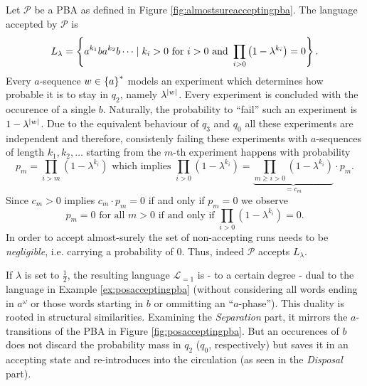 \begin{example}
 \cite{DecProblemsForProbAuto}
  Let $\mathcal{P}$ be a \ac{PBA} as defined in Figure 
  \ref{fig:almostsureacceptingpba}. The language accepted by $\mathcal{P}$ is
  \begin{equation*}
    L_{\lambda} = \left\{a^{k_{1}}ba^{k_{2}}b\dots\mid k_{i}>0\text{ for }i>0
    \text{ and }\prod\limits_{i>0}\left(1-\lambda^{k_{i}}\right) = 0\right\}.
  \end{equation*}
  Every $a$-sequence $w\in\left\{a\right\}^{*}$ models an experiment which determines 
  how probable it is to stay in $q_{2}$, namely $\lambda^{\left\vert{w}\right\vert}$. Every 
  experiment is concluded with the occurence of a single $b$. Naturally, the 
  probability to \enquote{fail} such an experiment is $1-\lambda^{\left\vert{w}\right\vert}$. 
  Due to the equivalent behaviour of $q_{3}$ and $q_{0}$ all these experiments 
  are independent and therefore, consistenly failing these experiments with 
  $a$-sequences of length $k_{1}, k_{2},\dots$ starting from the $m$-th 
  experiment happens with probability
  \begin{equation*}
    p_{m} = \prod\limits_{i>m}(1-\lambda^{k_{i}})
    \text{ which implies }
    \prod\limits_{i>0}(1-\lambda^{k_{i}}) = 
    \underbrace{\prod\limits_{m\geq i>0}(1-\lambda^{k_{i}})}_{=c_{m}}
    \cdot p_{m}.
  \end{equation*}
  Since $c_{m} > 0$ implies $c_{m}\cdot p_{m} = 0$ if and only if 
  $p_{m} = 0$ we observe
  \begin{equation*}
    p_{m} = 0 \text{ for all }m > 0\text{ if and only if }
      \prod\limits_{i>0}(1-\lambda^{k_{i}}) = 0.
  \end{equation*}
  In order to accept almost-surely the set of non-accepting runs needs to be
  \emph{negligible}, i.e. carrying a probability of $0$.  Thus, indeed 
  $\mathcal{P}$ accepts $L_{\lambda}$.

  If $\lambda$ is set to $\frac{1}{2}$, the resulting language 
  $\mathcal{L}_{=1}$ is - to a certain degree - dual to the language in Example 
  \ref{ex:posacceptingpba} (without considering all words ending in 
  $a^{\omega}$ or those words starting in $b$ or ommitting an 
  \enquote{$a$-phase}). This duality is rooted in structural similarities. 
  Examining the \emph{Separation} part, it mirrors the $a$-transitions of the 
  \ac{PBA} in Figure \ref{fig:posacceptingpba}. But an occurences of $b$ does 
  not discard the probability mass in $q_{2}$ ($q_0$, respectively) but saves
  it in an accepting state and re-introduces into the circulation (as seen in 
  the \emph{Disposal} part).
  \label{ex:almostsureacceptingpba}
\end{example}

